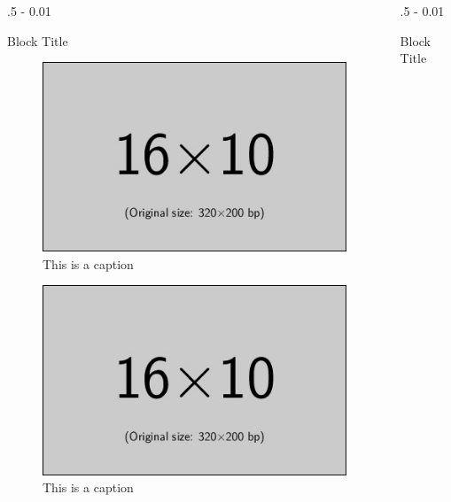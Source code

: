 \documentclass{postertheme}\usepackage[]{graphicx}\usepackage[]{color}
\begin{document}
\begin{frame}
\begin{columns}[onlytextwidth]
  \begin{column}{.5 \textwidth - 0.01 \textwidth}
    \begin{block}{Block Title}
      \begin{minipage}{\linewidth}
        \begin{minipage}{0.5 \linewidth}
          \begin{figure}
            \includegraphics[scale=1]{figures/example-image-16x10.jpg}
            \caption{This is a caption}
          \end{figure}
        \end{minipage}
        \hfill
        \begin{minipage}{0.5 \linewidth}
          \begin{figure}
            \includegraphics[scale=1]{figures/example-image-16x10.jpg}
            \caption{This is a caption}
          \end{figure}
        \end{minipage}
      \end{minipage}
    \end{block}
  \end{column}

  \begin{column}{.5 \textwidth - 0.01 \textwidth}
    \begin{block}{Block Title}
      \lipsum[2]
    \end{block}
  \end{column}
  

\end{columns}
\end{frame}
\end{document}
